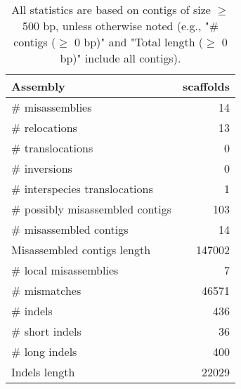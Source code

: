 \documentclass[12pt,a4paper]{article}
\begin{document}
\begin{table}[ht]
\begin{center}
\caption{All statistics are based on contigs of size $\geq$ 500 bp, unless otherwise noted (e.g., "\# contigs ($\geq$ 0 bp)" and "Total length ($\geq$ 0 bp)" include all contigs).}
\begin{tabular}{|l*{1}{|r}|}
\hline
Assembly & scaffolds \\ \hline
\# misassemblies & 14 \\ \hline
\hspace{5mm}\# relocations & 13 \\ \hline
\hspace{5mm}\# translocations & 0 \\ \hline
\hspace{5mm}\# inversions & 0 \\ \hline
\hspace{5mm}\# interspecies translocations & 1 \\ \hline
\# possibly misassembled contigs & 103 \\ \hline
\# misassembled contigs & 14 \\ \hline
Misassembled contigs length & 147002 \\ \hline
\# local misassemblies & 7 \\ \hline
\# mismatches & 46571 \\ \hline
\# indels & 436 \\ \hline
\hspace{5mm}\# short indels & 36 \\ \hline
\hspace{5mm}\# long indels & 400 \\ \hline
Indels length & 22029 \\ \hline
\end{tabular}
\end{center}
\end{table}
\end{document}
